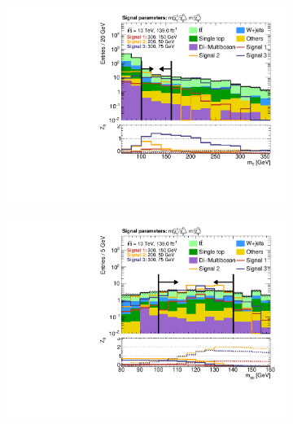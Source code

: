 \begin{figure}
\begin{subfigure}[b]{0.4\linewidth}
		\centering\includegraphics[width=\textwidth]{n1_SRLM_mct_bins/mt_both.pdf}
		\caption{\label{fig:Wh_reopt_second_round_n1_srlm_mt}}
	\end{subfigure}%
	\begin{subfigure}[b]{0.4\linewidth}
		\centering\includegraphics[width=\textwidth]{n1_SRLM_mct_bins/mbb_both.pdf}
		\caption{\label{fig:Wh_reopt_second_round_n1_srlm_mbb}}
	\end{subfigure}
	\begin{subfigure}[b]{0.4\linewidth}

\end{subfigure}
\end{figure}
